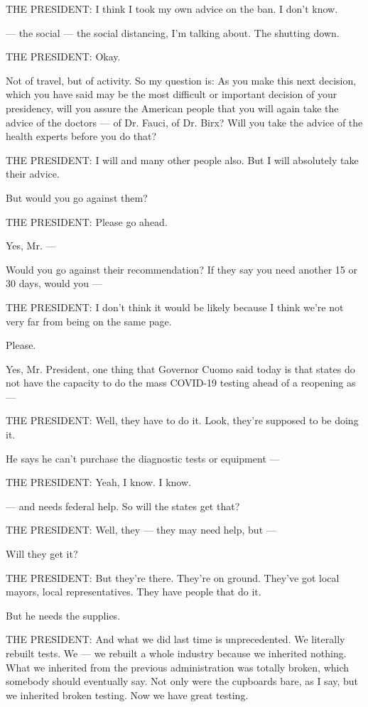 THE PRESIDENT: I think I took my own advice on the ban. I don't know.

--- the social --- the social distancing, I'm talking about. The
shutting down.

THE PRESIDENT: Okay.

Not of travel, but of activity. So my question is: As you make this next
decision, which you have said may be the most difficult or important
decision of your presidency, will you assure the American people that
you will again take the advice of the doctors --- of Dr. Fauci, of Dr.
Birx? Will you take the advice of the health experts before you do that?

THE PRESIDENT: I will and many other people also. But I will absolutely
take their advice.

But would you go against them?

THE PRESIDENT: Please go ahead.

Yes, Mr. ---

Would you go against their recommendation? If they say you need another
15 or 30 days, would you ---

THE PRESIDENT: I don't think it would be likely because I think we're
not very far from being on the same page.

Please.

Yes, Mr. President, one thing that Governor Cuomo said today is that
states do not have the capacity to do the mass COVID-19 testing ahead of
a reopening as ---

THE PRESIDENT: Well, they have to do it. Look, they're supposed to be
doing it.

He says he can't purchase the diagnostic tests or equipment ---

THE PRESIDENT: Yeah, I know. I know.

--- and needs federal help. So will the states get that?

THE PRESIDENT: Well, they --- they may need help, but ---

Will they get it?

THE PRESIDENT: But they're there. They're on ground. They've got local
mayors, local representatives. They have people that do it.

But he needs the supplies.

THE PRESIDENT: And what we did last time is unprecedented. We literally
rebuilt tests. We --- we rebuilt a whole industry because we inherited
nothing. What we inherited from the previous administration was totally
broken, which somebody should eventually say. Not only were the
cupboards bare, as I say, but we inherited broken testing. Now we have
great testing.

